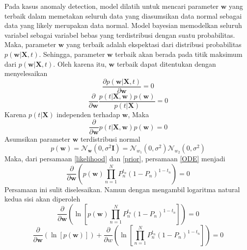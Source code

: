 Pada kasus anomaly detection, model dilatih untuk mencari parameter $\mathbf{w}$ yang terbaik dalam memetakan seluruh data yang diasumsikan data normal sebagai data yang likely merupakan data normal. Model bayesian memodelkan seluruh variabel sebagai variabel bebas yang terdistribusi dengan suatu probabilitas. Maka, parameter $\mathbf{w}$ yang terbaik adalah ekspektasi dari distribusi probabilitas $p(\mathbf{w}|\mathbf{X},t)$. Sehingga, parameter $\mathbf{w}$ terbaik akan berada pada titik maksimum dari $p(\mathbf{w}|\mathbf{X},t)$. Oleh karena itu, $\mathbf{w}$ terbaik dapat ditentukan dengan menyelesaikan
\begin{equation*}
    \frac{\partial{p(\mathbf{w}|\mathbf{X},t)}}{\partial{\mathbf{w}}} = 0
\end{equation*}
\begin{equation*}
    \frac{\partial}{\partial{\mathbf{w}}} \frac{p(t|\mathbf{X},\mathbf{w})p(\mathbf{w})}{p(t|\mathbf{X})} = 0
\end{equation*}
Karena $p(t|\mathbf{X})$ independen terhadap $\mathbf{w}$, Maka
\begin{equation}
    \frac{\partial}{\partial{\mathbf{w}}} p(t|\mathbf{X},\mathbf{w})p(\mathbf{w}) = 0 \label{ODE}
\end{equation}
Asumsikan parameter $\mathbf{w}$ terdistribusi normal
\begin{equation}
    p(\mathbf{w})=\mathcal{N}_\mathbf{w}\left(0,\sigma^2\mathbf{I}\right)=\mathcal{N}_{w_1}\left(0,\sigma^2\right)\mathcal{N}_{w_2}\left(0,\sigma^2\right) \label{prior}
\end{equation}
Maka, dari persamaan \ref{likelihood} dan \ref{prior}, persamaan \ref{ODE} menjadi
\begin{equation}
    \frac{\partial{}}{\partial{\mathbf{w}}} \left(p(\mathbf{w})\prod_{n=1}^{N} P_n^{t_n}\left(1-P_n\right)^{1-t_n}\right)=0
\end{equation}
Persamaan ini sulit diselesaikan. Namun dengan mengambil logaritma natural kedua sisi akan diperoleh
\begin{equation*}
    \frac{\partial{}}{\partial{\mathbf{w}}} \left(\ln{\left[p(\mathbf{w})\prod_{n=1}^{N} P_n^{t_n}\left(1-P_n\right)^{1-t_n}\right]}\right)=0
\end{equation*}
\begin{equation}
    \frac{\partial{}}{\partial{\mathbf{w}}}\left(\ln{\left[ p(\mathbf{w}) \right]}\right) + \frac{\partial{}}{\partial{w}} \left(\ln{\left[ \prod_{n=1}^{N} P_n^{t_n}\left(1-P_n\right)^{1-t_n}\right] }\right)=0
\end{equation}
